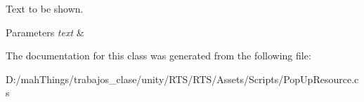 Text to be shown. 


\begin{DoxyParams}{Parameters}
{\em text} & \\
\hline
\end{DoxyParams}


The documentation for this class was generated from the following file\+:\begin{DoxyCompactItemize}
\item 
D\+:/mah\+Things/trabajos\+\_\+clase/unity/\+R\+T\+S/\+R\+T\+S/\+Assets/\+Scripts/Pop\+Up\+Resource.\+cs\end{DoxyCompactItemize}
